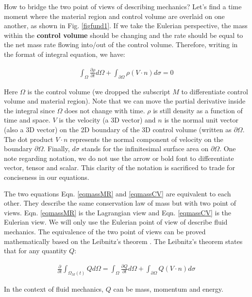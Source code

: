 \documentclass[12pt, letterpaper]{report}
\begin{document}
How to bridge the two point of views of describing mechanics? Let's find a time moment where the
material region and control volume are overlaid on one another, as shown in Fig. \ref{figfund1}.
If we take the Eulerian perspective, the mass within the {\bf control volume} should be changing
and the rate should be equal to the net mass rate flowing into/out of the control volume. Therefore,
writing in the format of integral equation, we have:

\begin{align}\label{eqmassCV}
   \int_{\Omega}\frac{\partial \rho}{\partial t}d\Omega + \int_{\partial \Omega}\rho (V\cdot n)
   d\sigma = 0
\end{align}

Here $\Omega$ is the control volume (we dropped the subscript $M$ to differentiate control volume
and material region). Note that we can move the partial derivative inside the integral since
$\Omega$ does not change with time. $\rho$ is still density as a function of time and space. $V$ is
the velocity (a 3D vector) and $n$ is the normal unit vector (also a 3D vector) on the 2D boundary
of the 3D control volume (written as $\partial \Omega$. The dot product $V\cdot n$ represents the
normal component of velocity on the boundary $\partial \Omega$. Finally, $d\sigma$ stands for the
infinitesimal surface area on $\partial \Omega$. One note regarding notation, we do not use the
arrow or bold font to differentiate vector, tensor and scalar. This clarity of the notation is
sacrificed to trade for conciseness in our equations.  \paraspace

The two equations Eqn. \ref{eqmassMR} and \ref{eqmassCV} are equivalent to each other. They
describe the same conservation law of mass but with two point of views. Eqn.
\ref{eqmassMR} is the Lagrangian view and Eqn. \ref{eqmassCV} is the Eulerian view. We will only use
the Eulerian point of view of describe fluid mechanics. The equivalence of the two point of views
can be proved mathematically based on the Leibnitz's theorem \cite{panton2013incompressible}. The
Leibnitz's theorem states that for any quantity $Q$:

\begin{align}\label{eqLeib}
   \frac{\partial}{\partial t}\int_{\Omega_M(t)}Q d\Omega = \int_\Omega \frac{\partial Q}{\partial
   t}d\Omega + \int_{\partial\Omega}Q (V\cdot n)d\sigma
\end{align}

In the context of fluid mechanics, $Q$ can be mass, momentum and energy.
\paraspace
\end{document}
